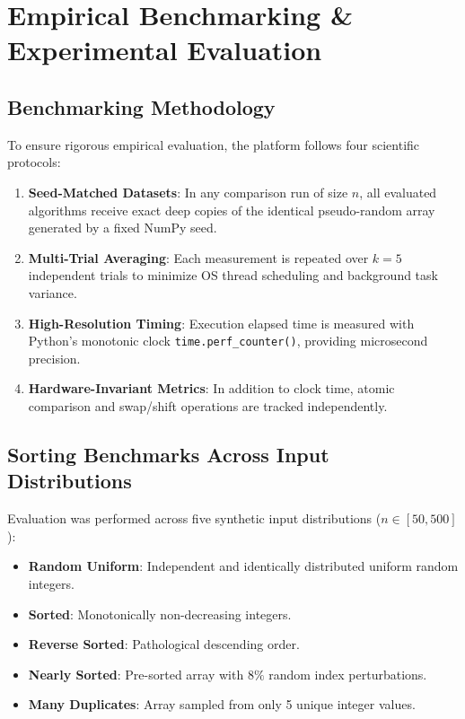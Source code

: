 \documentclass[11pt,a4paper]{article}
\theoremstyle{definition}
\theoremstyle{plain}
\theoremstyle{remark}
\begin{document}
\section{Empirical Benchmarking \& Experimental Evaluation}

\subsection{Benchmarking Methodology}
To ensure rigorous empirical evaluation, the platform follows four scientific protocols:
\begin{enumerate}
    \item \textbf{Seed-Matched Datasets}: In any comparison run of size $n$, all evaluated algorithms receive exact deep copies of the identical pseudo-random array generated by a fixed NumPy seed.
    \item \textbf{Multi-Trial Averaging}: Each measurement is repeated over $k = 5$ independent trials to minimize OS thread scheduling and background task variance.
    \item \textbf{High-Resolution Timing}: Execution elapsed time is measured with Python's monotonic clock \texttt{time.perf\_counter()}, providing microsecond precision.
    \item \textbf{Hardware-Invariant Metrics}: In addition to clock time, atomic comparison and swap/shift operations are tracked independently.
\end{enumerate}

\subsection{Sorting Benchmarks Across Input Distributions}
Evaluation was performed across five synthetic input distributions ($n \in [50, 500]$):
\begin{itemize}
    \item \textbf{Random Uniform}: Independent and identically distributed uniform random integers.
    \item \textbf{Sorted}: Monotonically non-decreasing integers.
    \item \textbf{Reverse Sorted}: Pathological descending order.
    \item \textbf{Nearly Sorted}: Pre-sorted array with $8\%$ random index perturbations.
    \item \textbf{Many Duplicates}: Array sampled from only 5 unique integer values.
\end{itemize}
\end{document}

